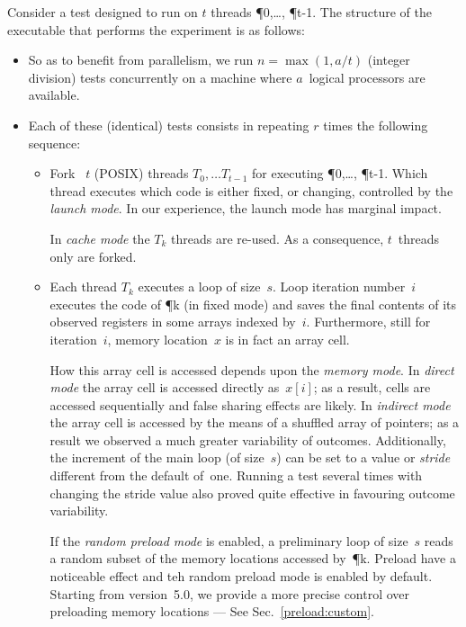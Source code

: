 Consider a test 
designed to run on $t$ threads \P{0},\ldots, \P{t-1}.
The structure of the executable  that performs
the experiment is as follows:
\begin{itemize}
\item \label{defn}\label{defa}So as to benefit from parallelism,
we run $n = \max(1,a/t)$ (integer division)
tests concurrently on a machine where $a$~logical processors are available.
\item \label{defr}Each of these (identical)
tests consists in repeating $r$ times
the following sequence:
\begin{itemize}
\item Fork ~$t$ (POSIX) threads $T_0,\ldots T_{t-1}$
for executing \P{0},\ldots, \P{t-1}.
Which thread executes which code is either fixed, or changing,
controlled by the \emph{launch mode}.
In our experience, the launch mode has marginal impact.

In \emph{cache mode} the $T_k$ threads are re-used.
As a consequence, $t$~threads only are forked.

\item \label{defs}Each thread $T_k$ executes a loop of size~$s$.
Loop iteration number~$i$ executes the code of \P{k} (in fixed mode)
and saves
the final contents of its observed registers in some arrays indexed by~$i$.
Furthermore, still for iteration~$i$, memory location~$x$ is in fact
an array cell.

\label{defmemorymode}\label{defstride}How this array cell is accessed depends
upon the \emph{memory mode}.
In \emph{direct mode} the array cell is accessed directly as~$x[i]$;
as a result, cells are accessed sequentially and false sharing effects
are likely.
In \emph{indirect mode} the array cell is accessed by the means of a
shuffled array of pointers;
as a result we observed a much greater variability of outcomes.
Additionally, the increment of the main loop (of size~$s$)
can be set to a value or \emph{stride} different from the default of~one.
Running a test several times with changing the stride value also
proved quite effective in favouring outcome variability.



\label{defpreload}If the \emph{random preload mode} is enabled,
a preliminary loop of size~$s$ reads
a random subset of the memory locations accessed by~\P{k}.
Preload have a noticeable effect and teh random preload mode is
enabled by default.
Starting from version~5.0, we provide a more precise control
over preloading memory locations --- See Sec.~\ref{preload:custom}.



\end{itemize}
\end{itemize}
